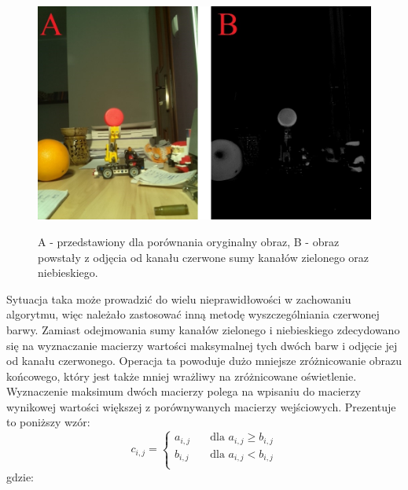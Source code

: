 \begin{figure}[H]
\begin{center}
\includegraphics[scale=0.42]{imgs/imgBase+sumBG.jpg}
\caption[Kanał czerwony minus zielony oraz niebieski.]\small{A - przedstawiony dla porównania oryginalny obraz, B - obraz powstały z odjęcia od kanału czerwone sumy kanałów zielonego oraz niebieskiego.}
\label{red-b+g}
\end{center}
\end{figure}
Sytuacja taka może prowadzić do wielu nieprawidłowości w zachowaniu algorytmu, więc należało zastosować inną metodę wyszczególniania czerwonej barwy. Zamiast odejmowania sumy kanałów zielonego i niebieskiego zdecydowano się na wyznaczanie macierzy wartości maksymalnej tych dwóch barw i odjęcie jej od kanału czerwonego. Operacja ta powoduje dużo mniejsze zróżnicowanie obrazu końcowego, który jest także mniej wrażliwy na zróżnicowane oświetlenie. Wyznaczenie maksimum dwóch macierzy polega na wpisaniu do macierzy wynikowej wartości większej z porównywanych macierzy wejściowych. Prezentuje to poniższy wzór:
\begin{equation}
c_{i,j} =
  \begin{cases}
    a_{i,j}	& \quad \text{dla } a_{i,j} \geq b_{i,j}\\
    b_{i,j}	& \quad \text{dla } a_{i,j} < b_{i,j}\\
  \end{cases}
\label{eq:progowanie}
\end{equation}
gdzie:
\begin{equationDescriptor}
\end{equationDescriptor}
